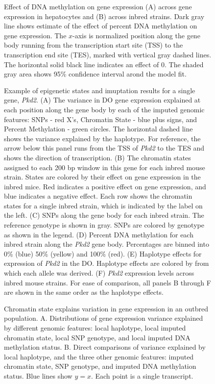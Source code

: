 \documentclass[10pt,letterpaper]{article}
\begin{document}
\begin{figure}[ht]
\centering
\caption{Effect of DNA methylation on gene expression (A) across gene expression
in hepatocytes and (B) across inbred strains. Dark gray line shows estimate
of the effect of percent DNA methylation on gene expression. The $x$-axis is
normalized position along the gene body running from the transcription start
site (TSS) to the transcription end site (TES), marked with vertical gray dashed
lines. The horizontal solid black line indicates an effect of 0. 
The shaded gray area shows 95\% confidence interval arond the model fit.}
\label{fig:DNA_methylation_effect}
\end{figure}

\begin{figure}[ht]
\centering
\caption{Example of epigenetic states and imuptation results for a single 
gene, \textit{Pkd2}. (A) The variance in DO gene expression explained at 
each position along the gene body by each of the imputed genomic 
features: SNPs - red X's, Chromatin State - blue plus signs, and 
Percent Methylation - green circles. The horizontal dashed line shows 
the variance explained by the haplotype. For reference, the arrow 
below this panel runs from the TSS of \textit{Pkd2} to the TES and 
shows the direction of transcription. (B) The chromatin states assigned 
to each 200 bp window in this gene for each inbred mouse strain. States 
are colored by their effect on gene expression in the inbred mice. Red 
indicates a positive effect on gene expression, and blue indicates a 
negative effect. Each row shows the chromatin states for a single inbred 
strain, which is indicated by the label on the left. (C) SNPs along the 
gene body for each inbred strain. The reference genotype is shown in gray. 
SNPs are colored by genotype as shown in the legend. (D) Percent DNA 
methylation for each inbred strain along the \textit{Pkd2} gene body. 
Percentages are binned into 0\% (blue) 50\% (yellow) and 100\% (red). 
(E) Haplotype effects for expression of \textit{Pkd2} in the DO. 
Haplotype effects are colored by from which each allele was derived. 
(F) \textit{Pkd2} expression levels across inbred mouse strains. For 
ease of comparison, all panels B through F are shown in the same order 
as the haplotype effects.}
\label{fig:example_gene}
\end{figure}

\begin{figure}[ht]
\centering
\caption{Chromatin state explains variation in gene expression in an outbred 
population. A. Distributions of gene expression variance explained by different 
genomic features: local haplotype, local imputed chromatin state, local SNP 
genotype, and local imputed DNA methylation status. B. Direct comparisons of 
variance explained by local haplotype, and the three other genomic features: 
imputed chromatin state, SNP genotype, and imputed DNA methylation status. 
Blue lines show $y = x$. Each point is a single transcript.}
\label{fig:effect_distrubutions}
\end{figure}
\end{document}

